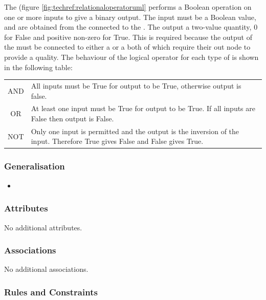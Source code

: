 The  (figure \ref{fig:techref:relationaloperatoruml} performs a Boolean operation on one or
more inputs to give a binary output. The input must be a Boolean
value, and are obtained from the  connected to the
. The output a two-value quantity,  0 for False and positive
non-zero for True. This is required because the output of the
 must be connected to either a
 or a  both of which
require their out node to provide a quality. The behaviour of the
logical operator for each type of  is shown in
the following table:

\begin{tabular}[t]{c p{12cm}}
\toprule
AND & All inputs must be True for output to be True, otherwise output
is false.\\
OR & At least one input must be True for output to be True. If all
inputs are False then output is False.\\
NOT & Only one input is permitted and the output is the inversion of
the input. Therefore True gives False and False gives True.\\
\bottomrule
\end{tabular}

\subsubsection{Generalisation}

\begin{itemize}
\item {}
\end{itemize}

\subsubsection{Attributes}

No additional attributes.

\subsubsection{Associations}

No additional associations.

\subsubsection{Rules and Constraints}


